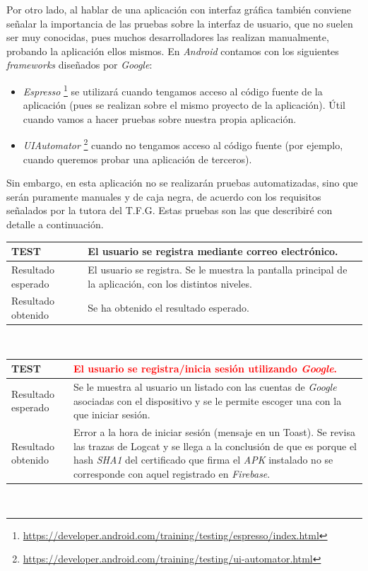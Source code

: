 \documentclass[twoside]{report}
\newcommand\addrow[2]{#1 &#2\\ }
\newcommand\addheading[2]{#1 &#2\\ \hline}
\newcommand\tabularhead{\begin{tabular}{lp{0.7\textwidth}}
\hline
}
\newenvironment{test}{\tabularhead}
{\hline\end{tabular}}
\begin{document}
Por otro lado, al hablar de una aplicación con interfaz gráfica también conviene señalar la importancia de las pruebas sobre la interfaz de usuario, que no suelen ser muy conocidas, pues muchos desarrolladores las realizan manualmente, probando la aplicación ellos mismos. En \textit{Android} contamos con los siguientes \textit{frameworks} diseñados por \textit{Google}:

\begin{itemize}
\item \textit{Espresso} \footnote{\url{https://developer.android.com/training/testing/espresso/index.html}} se utilizará cuando tengamos acceso al código fuente de la aplicación (pues se realizan sobre el mismo proyecto de la aplicación). Útil cuando vamos a hacer pruebas sobre nuestra propia aplicación.

\item \textit{UIAutomator} \footnote{\url{https://developer.android.com/training/testing/ui-automator.html}} cuando no tengamos acceso al código fuente (por ejemplo, cuando queremos probar una aplicación de terceros).

\end{itemize}


Sin embargo, en esta aplicación no se realizarán pruebas automatizadas, sino que serán puramente manuales y de caja negra, de acuerdo con los requisitos señalados por la tutora del T.F.G. Estas pruebas son las que describiré con detalle a continuación.

\vspace{1cm}

\begin{test}
  \addheading{\textbf{TEST\arabic{test}}}{El usuario se registra mediante correo electrónico.} 
  \addrow{Resultado esperado}{El usuario se registra. Se le muestra la pantalla principal de la aplicación, con los distintos niveles.}
  \addrow{Resultado obtenido}{Se ha obtenido el resultado esperado.}
\end{test}\\

\vspace{0.5cm}

\begin{test}
  \addheading{\textbf{TEST\arabic{test}}}{\textcolor{red}{El usuario se registra/inicia sesión utilizando \textit{Google}.}} 
  \addrow{Resultado esperado}{Se le muestra al usuario un listado con las cuentas de \textit{Google} asociadas con el dispositivo y se le permite escoger una con la que iniciar sesión.}
  \addrow{Resultado obtenido}{Error a la hora de iniciar sesión (mensaje en un Toast). Se revisa las trazas de Logcat y se llega a la conclusión de que es porque el hash \textit{SHA1} del certificado que firma el \textit{APK} instalado no se corresponde con aquel registrado en \textit{Firebase}.}
\end{test}\\
\end{document}
